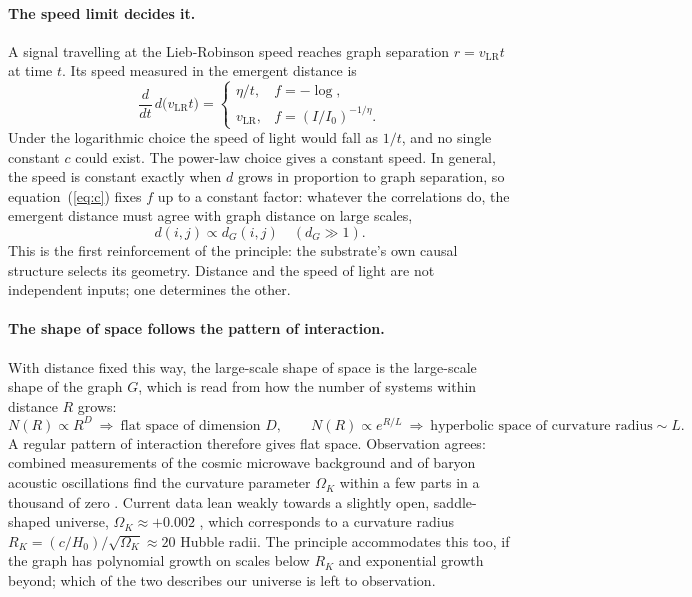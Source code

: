 \documentclass[aps,prd,onecolumn,nofootinbib,superscriptaddress]{revtex4-2}
\begin{document}
\paragraph{The speed limit decides it.} A signal travelling at the Lieb-Robinson speed reaches graph separation $r = v_{\mathrm{LR}}t$ at time $t$. Its speed measured in the emergent distance is
\begin{equation}
\frac{d}{dt}\,d\big(v_{\mathrm{LR}}t\big) =
\begin{cases}
\eta/t, & f = -\log, \\
v_{\mathrm{LR}}, & f = (I/I_0)^{-1/\eta}.
\end{cases}
\end{equation}
Under the logarithmic choice the speed of light would fall as $1/t$, and no single constant $c$ could exist. The power-law choice gives a constant speed. In general, the speed is constant exactly when $d$ grows in proportion to graph separation, so equation~(\ref{eq:c}) fixes $f$ up to a constant factor: whatever the correlations do, the emergent distance must agree with graph distance on large scales,
\begin{equation}
d(i,j) \propto d_G(i,j) \quad (d_G \gg 1).
\end{equation}
This is the first reinforcement of the principle: the substrate's own causal structure selects its geometry. Distance and the speed of light are not independent inputs; one determines the other.

\paragraph{The shape of space follows the pattern of interaction.} With distance fixed this way, the large-scale shape of space is the large-scale shape of the graph $G$, which is read from how the number of systems within distance $R$ grows:
\begin{equation}
N(R) \propto R^D \ \Rightarrow\ \text{flat space of dimension } D, \qquad N(R) \propto e^{R/L} \ \Rightarrow\ \text{hyperbolic space of curvature radius} \sim L.
\end{equation}
A regular pattern of interaction therefore gives flat space. Observation agrees: combined measurements of the cosmic microwave background and of baryon acoustic oscillations find the curvature parameter $\Omega_K$ within a few parts in a thousand of zero \cite{desi2025, chen2025}. Current data lean weakly towards a slightly open, saddle-shaped universe, $\Omega_K \approx +0.002$ \cite{chen2025}, which corresponds to a curvature radius $R_K = (c/H_0)/\sqrt{\Omega_K} \approx 20$ Hubble radii. The principle accommodates this too, if the graph has polynomial growth on scales below $R_K$ and exponential growth beyond; which of the two describes our universe is left to observation.
\end{document}
